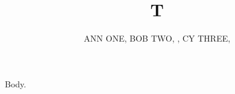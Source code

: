 \documentclass[journal]{IEEEtran}
\begin{document}
\title{T}
\author{\uppercase{Ann One}, \uppercase{Bob Two, },
\uppercase{Cy Three, }}
\maketitle
Body.
\end{document}

